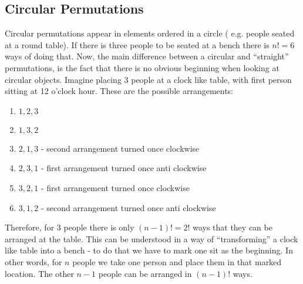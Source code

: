 \documentclass{article}
\begin{document}
\subsection{Circular Permutations}
Circular permutations appear in elements ordered in a circle ( e.g. people seated at a round table). If there is three people  to be seated at a bench there is $n!=6$ ways of doing that. Now, the main difference between a circular and ``straight'' permutations, is the fact that there is no obvious beginning when looking at circular objects. Imagine placing 3 people at a clock like table, with first person sitting at 12 o'clock hour. These are the possible arrangements:
\begin{enumerate}
\item $1,2,3$
\item $1,3,2$
\item $2,1,3$ - second arrangement turned once clockwise
\item $2,3,1$ - first arrangement turned once anti clockwise
\item $3,2,1$ - first arrangement turned once clockwise
\item $3,1,2$ - second arrangement turned once anti clockwise
\end{enumerate}
Therefore, for $3$ people there is only $(n-1)!=2!$ ways that they can be arranged at the table. This can be understood in a way of ``transforming'' a clock like table into a bench - to do that we have to mark one sit as the beginning. In other words, for $n$ people we take one person and place them in that marked location. The other $n-1$ people can be arranged in $(n-1)!$ ways.
\end{document}
